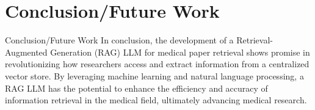 \documentclass{beamer}
\begin{document}
\section{Conclusion/Future Work}
\begin{frame}{Conclusion/Future Work}
In conclusion, the development of a Retrieval-Augmented Generation (RAG) LLM for medical paper retrieval shows promise in revolutionizing how researchers access and extract information from a centralized vector store. By leveraging machine learning and natural language processing, a RAG LLM has the potential to enhance the efficiency and accuracy of information retrieval in the medical field, ultimately advancing medical research.
\end{frame}
\end{document}
